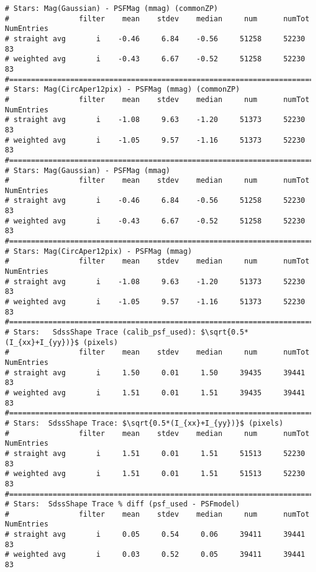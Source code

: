 \begin{verbatim}
# Stars: Mag(Gaussian) - PSFMag (mmag) (commonZP)
#                filter    mean    stdev    median     num      numTot  NumEntries
# straight avg       i    -0.46     6.84    -0.56     51258     52230        83
# weighted avg       i    -0.43     6.67    -0.52     51258     52230        83
#================================================================================
# Stars: Mag(CircAper12pix) - PSFMag (mmag) (commonZP)
#                filter    mean    stdev    median     num      numTot  NumEntries
# straight avg       i    -1.08     9.63    -1.20     51373     52230        83
# weighted avg       i    -1.05     9.57    -1.16     51373     52230        83
#================================================================================
# Stars: Mag(Gaussian) - PSFMag (mmag)
#                filter    mean    stdev    median     num      numTot  NumEntries
# straight avg       i    -0.46     6.84    -0.56     51258     52230        83
# weighted avg       i    -0.43     6.67    -0.52     51258     52230        83
#================================================================================
# Stars: Mag(CircAper12pix) - PSFMag (mmag)
#                filter    mean    stdev    median     num      numTot  NumEntries
# straight avg       i    -1.08     9.63    -1.20     51373     52230        83
# weighted avg       i    -1.05     9.57    -1.16     51373     52230        83
#================================================================================
# Stars:   SdssShape Trace (calib_psf_used): $\sqrt{0.5*(I_{xx}+I_{yy})}$ (pixels)
#                filter    mean    stdev    median     num      numTot  NumEntries
# straight avg       i     1.50     0.01     1.50     39435     39441        83
# weighted avg       i     1.51     0.01     1.51     39435     39441        83
#================================================================================
# Stars:  SdssShape Trace: $\sqrt{0.5*(I_{xx}+I_{yy})}$ (pixels)
#                filter    mean    stdev    median     num      numTot  NumEntries
# straight avg       i     1.51     0.01     1.51     51513     52230        83
# weighted avg       i     1.51     0.01     1.51     51513     52230        83
#================================================================================
# Stars:  SdssShape Trace % diff (psf_used - PSFmodel)
#                filter    mean    stdev    median     num      numTot  NumEntries
# straight avg       i     0.05     0.54     0.06     39411     39441        83
# weighted avg       i     0.03     0.52     0.05     39411     39441        83

\end{verbatim}
